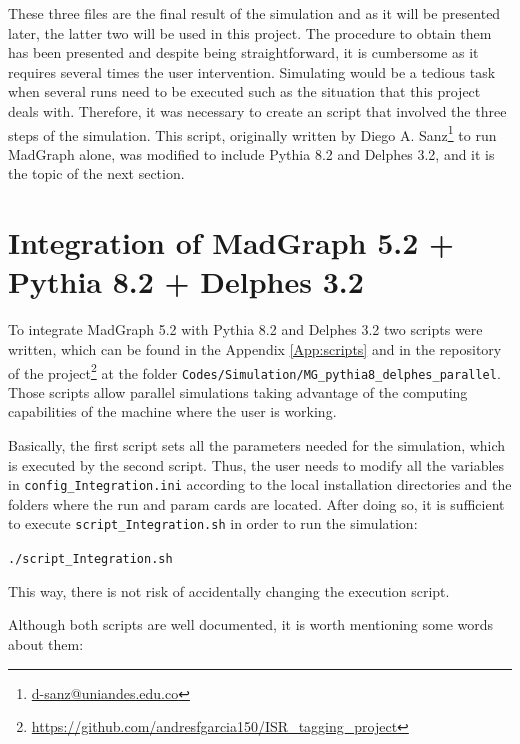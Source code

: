 \documentclass[12pt, oneside]{book}              %
\begin{document}
These three files are the final result of the simulation and as it will
be presented later, the latter two will be used in this project. The
procedure to obtain them has been presented and despite being straightforward,
it is cumbersome as it requires several times the user intervention.
Simulating would be a tedious task when several runs need to be executed such as
the situation that this project deals with. Therefore, it was necessary
to create an script that involved the three steps of the simulation. This
script, originally written by Diego A. Sanz\footnote{\url{d-sanz@uniandes.edu.co}}
to run MadGraph alone, was modified to include Pythia 8.2 and Delphes 3.2,
and it is the topic of the next section.

\section{Integration of MadGraph 5.2 + Pythia 8.2 + Delphes 3.2}

To integrate MadGraph 5.2 with Pythia 8.2 and Delphes 3.2 two scripts were
written, which can be found in the Appendix \ref{App:scripts} and in the 
repository of the project\footnote{\url{https://github.com/andresfgarcia150/ISR_tagging_project}}
at the folder \texttt{Codes/Simulation/MG\_pythia8\_delphes\_parallel}.
Those scripts allow parallel simulations taking advantage of the
computing capabilities of the machine where the user is working.

Basically, the first script sets all the parameters needed for
the simulation, which is executed by the second script. Thus, the
user needs to modify all the variables in \texttt{config\_Integration.ini}
according to the local installation directories and the folders
where the run and param cards are located. After doing so, it
is sufficient to execute \texttt{script\_Integration.sh} in order to run
the simulation:

\texttt{./script\_Integration.sh}

\noindent This way, there is not risk of accidentally changing the execution
script.

Although both scripts are well documented, it is worth mentioning
some words about them:
\end{document}

